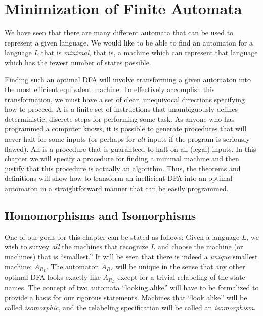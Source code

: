 \chapter{Minimization of Finite Automata}\label{ch-3}

We have seen that there are many different automata that can be
used to represent a given language. We would like to be able to
find an automaton for a language $L$ that is \emph{minimal}, that is, a
machine which can represent that language which has the fewest
number of states possible.

Finding such an optimal DFA will involve transforming a given
automaton into the most efficient equivalent machine. To effectively
accomplish this transformation, we must have a set of clear,
unequivocal directions specifying how to proceed. A \emph{}
is a finite set of instructions that unambiguously defines deterministic,
discrete steps for performing some task. As anyone who has programmed
a computer knows, it is possible to generate procedures that will
never halt for some inputs (or perhaps for \emph{all} inputs if the program
is seriously flawed). An \emph{} is a procedure that is
guaranteed to halt on all (legal) inputs. In this chapter we will specify a
procedure for finding a minimal machine and then justify that this
procedure is actually an algorithm. Thus, the theorems and definitions
will show how to transform an inefficient DFA into an optimal
automaton in a straightforward manner that can be easily programmed.

\section{Homomorphisms and Isomorphisms}\label{sec-3.1}

One of our goals for this chapter can be stated as follows: Given
a language $L$, we wish to survey \emph{all} the machines that recognize
$L$ and choose the machine (or machines) that is ``smallest.'' It
will be seen that there is indeed a \emph{unique} smallest machine: $A_{R_L}$.
The automaton $A_{R_L}$ will be unique in the sense that any other
optimal DFA looks exactly like $A_{R_L}$ except for a trivial relabeling
of the state names.  The concept of two automata ``looking alike''
will have to be formalized to provide a basis for our rigorous
statements. Machines that ``look alike'' will be called \emph{isomorphic},
and the relabeling specification will be called an \emph{isomorphism}.

